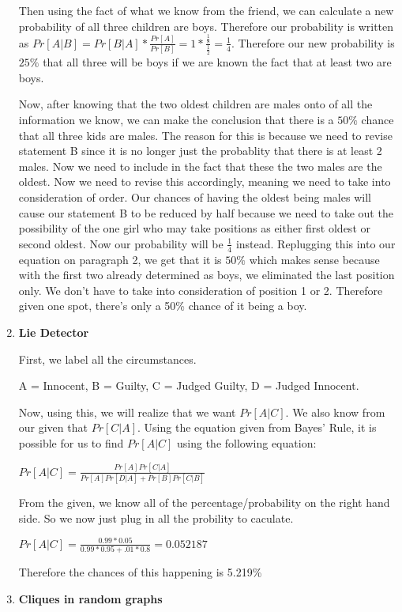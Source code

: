 \documentclass[12pt,fleqn]{article}
\begin{document}
\begin{enumerate}
  Then using the fact of what we know from the friend, we can calculate a new probability of all three children are boys. Therefore our probability is written as $Pr[A|B] = Pr[B|A] * \frac{Pr[A]}{Pr[B]} = 1 * \frac{\frac{1}{8}}{\frac{1}{2}} = \frac{1}{4}$. Therefore our new probability is $25\%$ that all three will be boys if we are known the fact that at least two are boys. 
  
  Now, after knowing that the two oldest children are males onto of all the information we know, we can make the conclusion that there is a $50\%$ chance that all three kids are males. The reason for this is because we need to revise statement B since it is no longer just the probablity that there is at least 2 males. Now we need to include in the fact that these the two males are the oldest. Now we need to revise this accordingly, meaning we need to take into consideration of order. Our chances of having the oldest being males will cause our statement B to be reduced by half because we need to take out the possibility of the one girl who may take positions as either first oldest or second oldest. Now our probability will be $\frac{1}{4}$ instead. Replugging this into our equation on paragraph 2, we get that it is $50\%$ which makes sense because with the first two already determined as boys, we eliminated the last position only. We don't have to take into consideration of position 1 or 2. Therefore given one spot, there's only a 50\% chance of it being a boy. 
  
  \newpage
  \item \textbf{Lie Detector}
  
  First, we label all the circumstances. 
  
  A = Innocent, B = Guilty, C = Judged Guilty, D = Judged Innocent.  

  Now, using this, we will realize that we want $Pr[A | C]$. We also know from our given that $Pr[C|A]$. Using the equation given from Bayes' Rule, it is possible for us to find $Pr[A|C]$ using the following equation:
  
  $Pr[A|C] = \frac{Pr[A]Pr[C|A]}{Pr[A]Pr[D|A] + Pr[B]Pr[C | B]}  $
  
  From the given, we know all of the percentage/probability on the right hand side. So we now just plug in all the probility to caculate.
  
  $Pr[A|C] = \frac{0.99*0.05}{0.99*0.95 + .01*0.8} = 0.052187$
  
  Therefore the chances of this happening is 5.219\%
  \newpage
  \item \textbf{Cliques in random graphs}
  

\end{enumerate}
\end{document}
